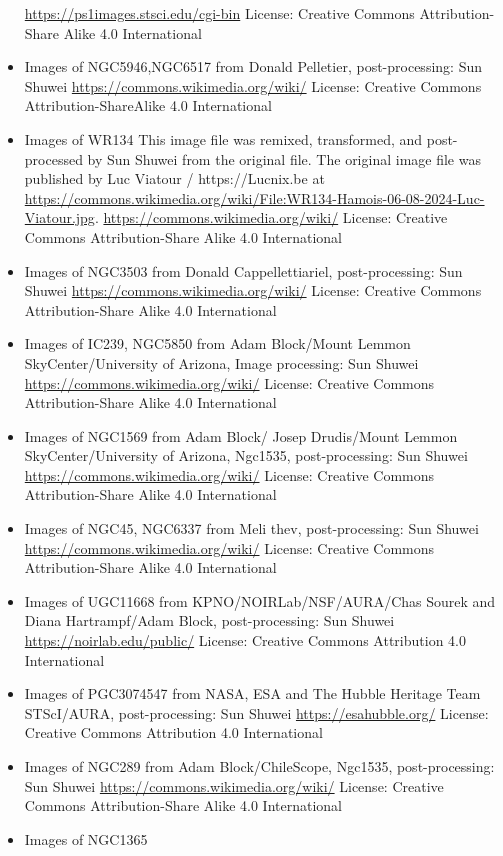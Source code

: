 \begin{itemize}
	 \url{https://ps1images.stsci.edu/cgi-bin}
	 License: Creative Commons Attribution-Share Alike 4.0 International 
\item Images of NGC5946,NGC6517
	 from Donald Pelletier, post-processing: Sun Shuwei 
	 \url{https://commons.wikimedia.org/wiki/}
	 License: Creative Commons Attribution-ShareAlike 4.0 International 
\item Images of WR134
	 This image file was remixed, transformed, and post-processed by Sun Shuwei from the original file. The original image file was published by Luc Viatour / https://Lucnix.be at \url{https://commons.wikimedia.org/wiki/File:WR134-Hamois-06-08-2024-Luc-Viatour.jpg}.
	 \url{https://commons.wikimedia.org/wiki/}
	 License: Creative Commons Attribution-Share Alike 4.0 International
\item Images of NGC3503
	 from Donald Cappellettiariel, post-processing: Sun Shuwei
	 \url{https://commons.wikimedia.org/wiki/}
	 License: Creative Commons Attribution-Share Alike 4.0 International
\item Images of IC239, NGC5850
	 from Adam Block/Mount Lemmon SkyCenter/University of Arizona, Image processing: Sun Shuwei
	 \url{https://commons.wikimedia.org/wiki/}
	 License: Creative Commons Attribution-Share Alike 4.0 International
\item Images of NGC1569
	 from Adam Block/ Josep Drudis/Mount Lemmon SkyCenter/University of Arizona, Ngc1535, post-processing: Sun Shuwei
	 \url{https://commons.wikimedia.org/wiki/}
	 License: Creative Commons Attribution-Share Alike 4.0 International
\item Images of NGC45, NGC6337
	 from Meli thev, post-processing: Sun Shuwei
	 \url{https://commons.wikimedia.org/wiki/}
	 License: Creative Commons Attribution-Share Alike 4.0 International
\item Images of UGC11668
	 from KPNO/NOIRLab/NSF/AURA/Chas Sourek and Diana Hartrampf/Adam Block, post-processing: Sun Shuwei
	 \url{https://noirlab.edu/public/}
	 License: Creative Commons Attribution 4.0 International
\item Images of PGC3074547
	 from NASA, ESA and The Hubble Heritage Team STScI/AURA, post-processing: Sun Shuwei
	 \url{https://esahubble.org/}
	 License: Creative Commons Attribution 4.0 International
\item Images of NGC289
	 from Adam Block/ChileScope, Ngc1535, post-processing: Sun Shuwei
	 \url{https://commons.wikimedia.org/wiki/}
	 License: Creative Commons Attribution-Share Alike 4.0 International
\item Images of NGC1365

\end{itemize}
